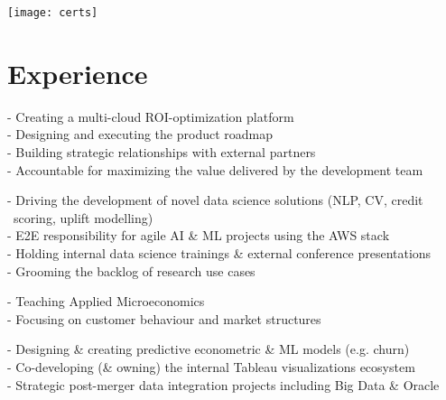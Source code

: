 \documentclass[a4paper]{twentysecondcv} %
\begin{document}
\texttt{[image: certs]}

\section{Experience}

\begin{twenty} %


{\small - Creating a multi-cloud ROI-optimization platform\\
        - Designing and executing the product roadmap\\
        - Building strategic relationships with external partners\\
        - Accountable for maximizing the value delivered by the development team
}	

{\small - Driving the development of novel data science solutions (NLP, CV, credit \textcolor{white}{-a}scoring, uplift modelling)\\
        - E2E responsibility for agile AI \& ML projects using the AWS stack\\
        - Holding internal data science trainings \& external conference presentations \\
        - Grooming the backlog of research use cases     
}

{\small - Teaching Applied Microeconomics\\
        - Focusing on customer behaviour and market structures
}	

{\small - Designing \& creating predictive econometric \& ML models (e.g. \hspace{-6pt} churn)\\
            - Co-developing (\& owning) the internal Tableau visualizations ecosystem\\ 
            - Strategic post-merger data integration projects including Big Data \& Oracle}


\end{twenty}
\end{document}
